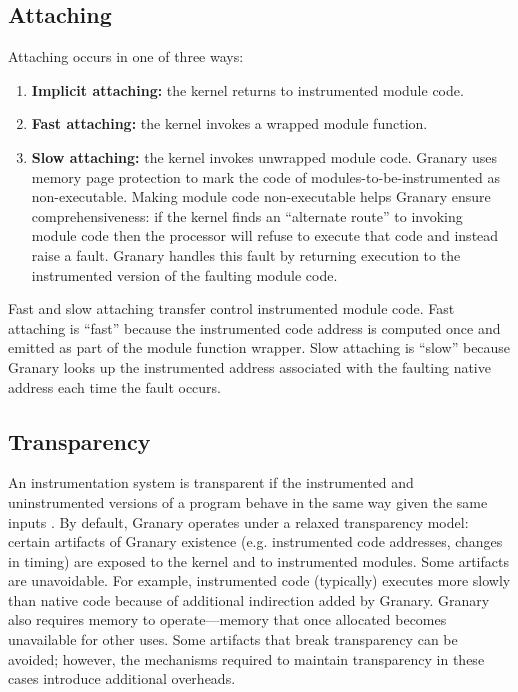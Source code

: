 \documentclass[letterpaper,twocolumn,10pt]{article}
\begin{document}
\subsection{Attaching}
Attaching occurs in one of three ways: \begin{enumerate}
	\item {\bf Implicit attaching:} the kernel returns to instrumented module code.
	\item {\bf Fast attaching:} the kernel invokes a wrapped module function.
	\item {\bf Slow attaching:} the kernel invokes unwrapped module code. Granary uses memory page protection to mark the code of modules-to-be-instrumented as non-executable. Making module code non-executable helps Granary ensure comprehensiveness: if the kernel finds an ``alternate route'' to invoking module code then the processor will refuse to execute that code and instead raise a fault. Granary handles this fault by returning execution to the instrumented version of the faulting module code.
\end{enumerate}

Fast and slow attaching transfer control instrumented module code. Fast attaching is ``fast'' because the instrumented code address is computed once and emitted as part of the module function wrapper. Slow attaching is ``slow'' because Granary looks up the instrumented address associated with the faulting native address each time the fault occurs.

\subsection{Transparency}
An instrumentation system is transparent if the instrumented and uninstrumented versions of a program behave in the same way given the same inputs \cite{Transparency}. By default, Granary operates under a relaxed transparency model: certain artifacts of Granary existence (e.g. instrumented code addresses, changes in timing) are exposed to the kernel and to instrumented modules. Some artifacts are unavoidable. For example, instrumented code (typically) executes more slowly than native code because of additional indirection added by Granary. Granary also requires memory to operate---memory that once allocated becomes unavailable for other uses. Some artifacts that break transparency can be avoided; however, the mechanisms required to maintain transparency in these cases introduce additional overheads.
\end{document}
